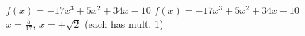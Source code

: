 {$f(x) = -17x^{3} + 5x^{2} + 34x - 10$}
{$f(x) = -17x^{3} + 5x^{2} + 34x - 10$ \\ $x = \frac{5}{17}$, $x = \pm \sqrt{2}$ (each has mult. 1)}